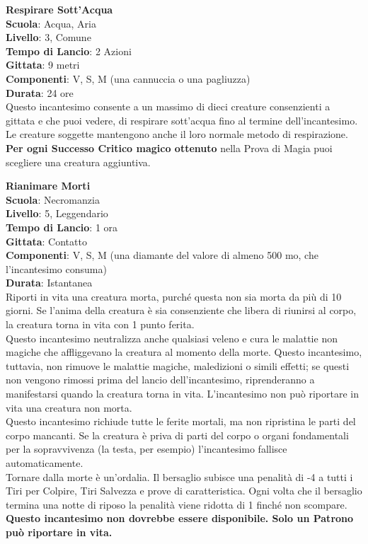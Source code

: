 \begin{multicols}{2}
\medskip\textbf{Respirare Sott'Acqua}\\
\textbf{Scuola}: Acqua, Aria\\
\textbf{Livello}: 3, Comune\\
\textbf{Tempo di Lancio}: 2 Azioni\\
\textbf{Gittata}: 9 metri\\
\textbf{Componenti}: V, S, M (una cannuccia o una pagliuzza)\\
\textbf{Durata}: 24 ore\\
Questo incantesimo consente a un massimo di dieci creature consenzienti a gittata e che puoi vedere, di respirare sott'acqua fino al termine dell'incantesimo. Le creature soggette mantengono anche il loro normale metodo di respirazione.\\
\textbf{Per ogni Successo Critico magico ottenuto} nella Prova di Magia puoi scegliere una creatura aggiuntiva.

\medskip\textbf{Rianimare Morti}\\
\textbf{Scuola}: Necromanzia\\
\textbf{Livello}: 5, Leggendario\\
\textbf{Tempo di Lancio}: 1 ora\\
\textbf{Gittata}: Contatto\\
\textbf{Componenti}: V, S, M (una diamante del valore di almeno 500 mo, che l'incantesimo consuma)\\
\textbf{Durata}: Istantanea\\
Riporti in vita una creatura morta, purché questa non sia morta da più di 10 giorni. Se l'anima della creatura è sia consenziente che libera di riunirsi al corpo, la creatura torna in vita con 1 punto ferita.\\
Questo incantesimo neutralizza anche qualsiasi veleno e cura le malattie non magiche che affliggevano la creatura al momento della morte. Questo incantesimo, tuttavia, non rimuove le malattie magiche, maledizioni o simili effetti; se questi non vengono rimossi prima del lancio dell'incantesimo, riprenderanno a manifestarsi quando la creatura torna in vita. L'incantesimo non può riportare in vita una creatura non morta.\\
Questo incantesimo richiude tutte le ferite mortali, ma non ripristina le parti del corpo mancanti. Se la creatura è priva di parti del corpo o organi fondamentali per la sopravvivenza (la testa, per esempio) l'incantesimo fallisce automaticamente.\\
Tornare dalla morte è un'ordalia. Il bersaglio subisce una penalità di -4 a tutti i Tiri per Colpire, Tiri Salvezza e prove di caratteristica. Ogni volta che il bersaglio termina una notte di riposo la penalità viene ridotta di 1 finché non scompare.\\
\textbf{Questo incantesimo non dovrebbe essere disponibile. Solo un Patrono può riportare in vita.}


\end{multicols}
